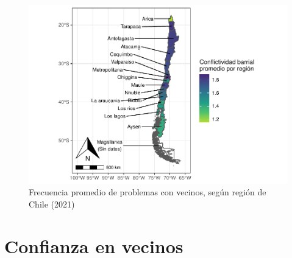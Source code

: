 \documentclass[
  12pt,
]{book}
\begin{document}
\begin{figure}

{\centering \includegraphics{reporte-elsoc_files/figure-latex/confli-region2-1} 

}

\caption{Frecuencia promedio de problemas con vecinos, según región de Chile (2021)}\label{fig:confli-region2}
\end{figure}

\hypertarget{confianza-en-vecinos}{%
\section{Confianza en vecinos}\label{confianza-en-vecinos}}
\end{document}
